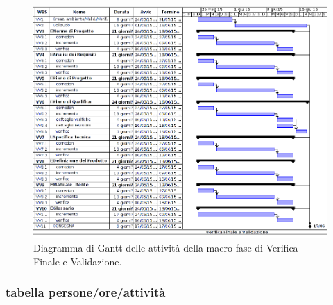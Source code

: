 \begin{figure}[h]
\begin{center}
\includegraphics[width=\textwidth, height=\textheight, keepaspectratio]{img/verival-gantt.png}
\caption{Diagramma di Gantt delle attività della macro-fase di Verifica Finale e Validazione.}
\end{center}
\end{figure}
\clearpage

\newpage
\subsubsection{tabella persone/ore/attività}

